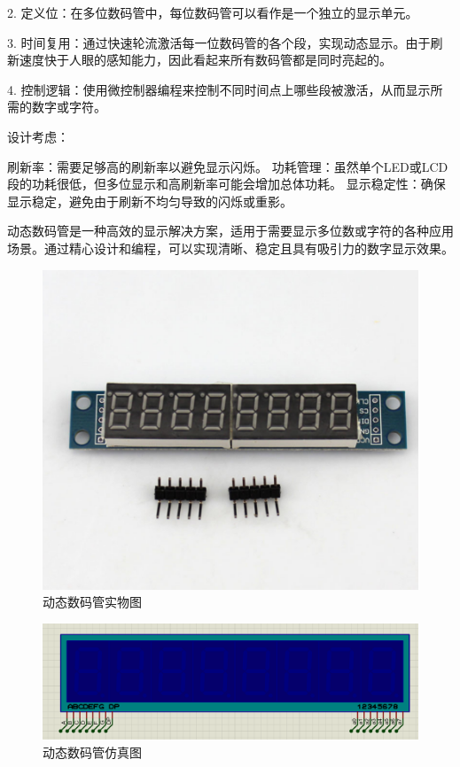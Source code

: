 \documentclass{textreportclass}  %
\begin{document}
	2. 定义位：在多位数码管中，每位数码管可以看作是一个独立的显示单元。
	
	3. 时间复用：通过快速轮流激活每一位数码管的各个段，实现动态显示。由于刷新速度快于人眼的感知能力，因此看起来所有数码管都是同时亮起的。
	
	4. 控制逻辑：使用微控制器编程来控制不同时间点上哪些段被激活，从而显示所需的数字或字符。
	
	设计考虑：
	
	刷新率：需要足够高的刷新率以避免显示闪烁。
	功耗管理：虽然单个LED或LCD段的功耗很低，但多位显示和高刷新率可能会增加总体功耗。
	显示稳定性：确保显示稳定，避免由于刷新不均匀导致的闪烁或重影。
	
	动态数码管是一种高效的显示解决方案，适用于需要显示多位数或字符的各种应用场景。通过精心设计和编程，可以实现清晰、稳定且具有吸引力的数字显示效果。
	
	\begin{figure}[htbp]
		\centering
		\includegraphics[scale=0.4]{Fig/动态数码管实物图.png}
		\caption{动态数码管实物图}\label{Fig.18}
	\end{figure}
	
	\begin{figure}[htbp]
		\centering
		\includegraphics[scale=0.4]{Fig/7SEG-MPX.png}
		\caption{动态数码管仿真图}\label{Fig.19}
	\end{figure}
	
\end{document}
